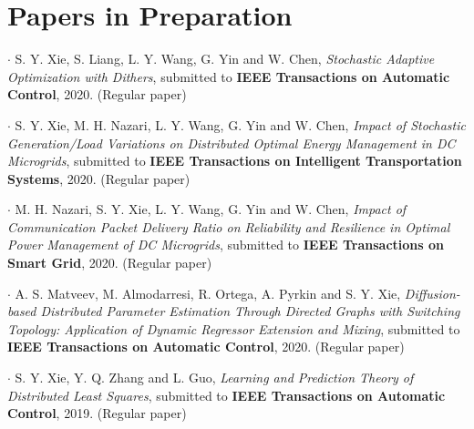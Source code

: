 \documentclass[letterpaper]{article}
\renewenvironment{itemize}{
  \begin{list}{}{
    \setlength{\leftmargin}{1em}
  }
}{
  \end{list}
}
\begin{document}
\section*{Papers in Preparation}
\begin{itemize}
\item $\bm{\cdot}$ S. Y. Xie, S. Liang, L. Y. Wang, G. Yin and W. Chen, \emph{Stochastic Adaptive Optimization with Dithers}, submitted to \textbf{IEEE Transactions on Automatic Control}, 2020. (Regular paper)
\item $\bm{\cdot}$ S. Y. Xie, M. H. Nazari, L. Y. Wang, G. Yin and W. Chen, \emph{Impact of Stochastic Generation/Load Variations on
Distributed Optimal Energy Management in DC
Microgrids}, submitted to \textbf{IEEE Transactions on Intelligent Transportation Systems}, 2020. (Regular paper)
\item $\bm{\cdot}$ M. H. Nazari, S. Y. Xie, L. Y. Wang, G. Yin and W. Chen, \emph{Impact of Communication Packet Delivery Ratio on Reliability and Resilience in Optimal Power Management of DC Microgrids}, submitted to \textbf{IEEE Transactions on Smart Grid}, 2020. (Regular paper)
\item $\bm{\cdot}$ A. S. Matveev, M. Almodarresi, R.
Ortega, A. Pyrkin and S. Y. Xie, \emph{Diffusion-based Distributed Parameter Estimation Through Directed Graphs with Switching Topology: Application of Dynamic Regressor Extension and Mixing}, submitted to \textbf{IEEE Transactions on Automatic Control}, 2020. (Regular paper)
\item $\bm{\cdot}$ S. Y. Xie, Y. Q. Zhang and L. Guo, \emph{Learning and Prediction Theory of Distributed Least Squares}, submitted to \textbf{IEEE Transactions on Automatic Control}, 2019. (Regular paper)
\end{itemize}




\end{document}
